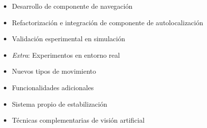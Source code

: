 \documentclass[notes,slidesec,a4]{seminar}
\begin{document}
\begin{hslide}

\begin{itemize}
\item Desarrollo de componente de navegación
\item Refactorización e integración de componente de autolocalización
\item Validación esperimental en simulación
\item \textit{Extra}: Experimentos en entorno real
\end{itemize}

\end{hslide}


\begin{hslide}

\begin{itemize}
\item Nuevos tipos de movimiento
\item Funcionalidades adicionales
\item Sistema propio de estabilización
\item Técnicas complementarias de visión artificial
\end{itemize}

\end{hslide}
\end{document}
